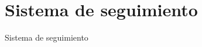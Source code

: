 \documentclass[]{beamer}
\begin{document}
\section{Sistema de seguimiento}
\begin{frame}[t]{Sistema de seguimiento}






\end{frame}
\end{document}
